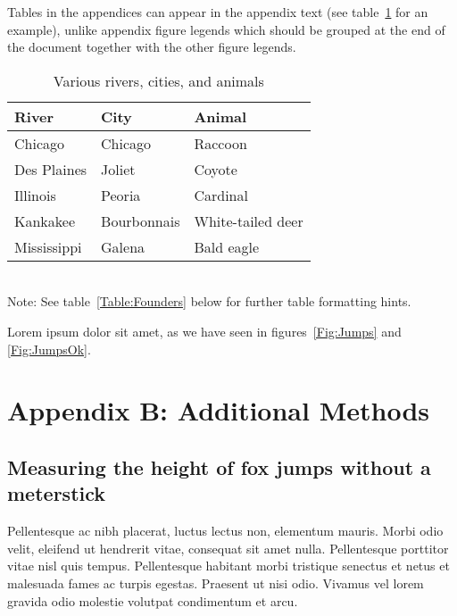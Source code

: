 \documentclass[11pt]{article}
\begin{document}
Tables in the appendices can appear in the appendix text (see table~\ref{Table:Rivers} for an example), unlike appendix figure legends which should be grouped at the end of the document together with the other figure legends.

\begin{table}[h]
\caption{Various rivers, cities, and animals}
\label{Table:Rivers}
\centering
\begin{tabular}{lll}\hline
River        & City        & Animal            \\ \hline
Chicago      & Chicago     & Raccoon           \\
Des Plaines  & Joliet      & Coyote            \\
Illinois     & Peoria      & Cardinal          \\
Kankakee     & Bourbonnais & White-tailed deer \\
Mississippi  & Galena      & Bald eagle        \\ \hline
\end{tabular}
\bigskip{}
\\
{\footnotesize Note: See table~\ref{Table:Founders} below for further table formatting hints.}
\end{table}

Lorem ipsum dolor sit amet, as we have seen in figures~\ref{Fig:Jumps} and \ref{Fig:JumpsOk}.

\newpage{}
\renewcommand{\theequation}{B\arabic{equation}}
\renewcommand{\thetable}{B\arabic{table}}
\setcounter{equation}{0}  %
\setcounter{table}{0}

\section*{Appendix B: Additional Methods}

\subsection*{Measuring the height of fox jumps without a meterstick}

Pellentesque ac nibh placerat, luctus lectus non, elementum mauris. 
Morbi odio velit, eleifend ut hendrerit vitae, consequat sit amet 
nulla. Pellentesque porttitor vitae nisl quis tempus. Pellentesque 
habitant morbi tristique senectus et netus et malesuada fames ac 
turpis egestas. Praesent ut nisi odio. Vivamus vel lorem gravida 
odio molestie volutpat condimentum et arcu. 
\end{document}
